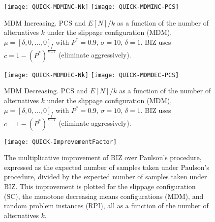 \documentclass[12pt]{article}
\newcommand{\E}{E}
\newcommand{\sigmacom}{\sigma}
\newcommand{\cmax}{1-(P^*)^{\frac1{k-1}}}
\begin{document}
  \begin{figure}[tb]
    \center
    \texttt{[image: QUICK-MDMINC-Nk]} 
    \texttt{[image: QUICK-MDMINC-PCS]}
    \caption{MDM Increasing.  
    PCS and $\E[N]/k$ as a function of the number of alternatives $k$ under the slippage configuration (MDM),
    $\mu=[\delta,0,\ldots,0]$, with $P^*=0.9$, $\sigmacom=10$,
    $\delta=1$.
    BIZ uses $c=\cmax$ (eliminate aggressively).  
    \label{fig:MDMINC}}
  \end{figure}
  
  \begin{figure}[tb]
    \center
    \texttt{[image: QUICK-MDMDEC-Nk]} 
    \texttt{[image: QUICK-MDMDEC-PCS]}
    \caption{MDM Decreasing.  
    PCS and $\E[N]/k$ as a function of the number of alternatives $k$ under the slippage configuration (MDM),
    $\mu=[\delta,0,\ldots,0]$, with $P^*=0.9$, $\sigmacom=10$,
    $\delta=1$.
    BIZ uses $c=\cmax$ (eliminate aggressively).  
    \label{fig:MDMDEC}}
  \end{figure}


  \begin{figure}[tb]
    \center
    \texttt{[image: QUICK-ImprovementFactor]}
    \caption{The multiplicative improvement of BIZ over Paulson's procedure, expressed as the expected number of samples
    taken under Paulson's procedure, divided by
    the expected number of samples taken under BIZ.  This improvement is plotted for the slippage configuration (SC),
    the monotone decreasing means configurations (MDM), and random problem instances (RPI), all as a function of the number of alternatives $k$.
    \label{fig:improvement}}
  \end{figure}

 
\end{document}
